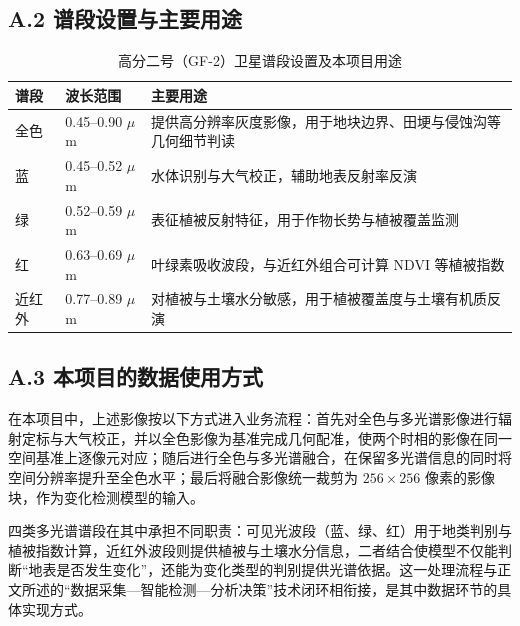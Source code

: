 \documentclass[12pt, a4paper]{ctexart}
\begin{document}
\subsection{A.2 谱段设置与主要用途}

\begin{table}[htbp]
    \centering
    \caption{高分二号（GF-2）卫星谱段设置及本项目用途}
    \label{tab:gf2-bands}
    \small
    \begin{tabular}{|p{2.4cm}|p{3.4cm}|p{7.6cm}|}
        \hline
        \textbf{谱段} & \textbf{波长范围} & \textbf{主要用途} \\
        \hline
        全色 & 0.45--0.90 $\mu$m & 提供高分辨率灰度影像，用于地块边界、田埂与侵蚀沟等几何细节判读 \\
        \hline
        蓝 & 0.45--0.52 $\mu$m & 水体识别与大气校正，辅助地表反射率反演 \\
        \hline
        绿 & 0.52--0.59 $\mu$m & 表征植被反射特征，用于作物长势与植被覆盖监测 \\
        \hline
        红 & 0.63--0.69 $\mu$m & 叶绿素吸收波段，与近红外组合可计算 NDVI 等植被指数 \\
        \hline
        近红外 & 0.77--0.89 $\mu$m & 对植被与土壤水分敏感，用于植被覆盖度与土壤有机质反演 \\
        \hline
    \end{tabular}
\end{table}

\subsection{A.3 本项目的数据使用方式}

在本项目中，上述影像按以下方式进入业务流程：首先对全色与多光谱影像进行辐射定标与大气校正，并以全色影像为基准完成几何配准，使两个时相的影像在同一空间基准上逐像元对应；随后进行全色与多光谱融合，在保留多光谱信息的同时将空间分辨率提升至全色水平；最后将融合影像统一裁剪为 $256 \times 256$ 像素的影像块，作为变化检测模型的输入。

四类多光谱谱段在其中承担不同职责：可见光波段（蓝、绿、红）用于地类判别与植被指数计算，近红外波段则提供植被与土壤水分信息，二者结合使模型不仅能判断“地表是否发生变化”，还能为变化类型的判别提供光谱依据。这一处理流程与正文所述的“数据采集—智能检测—分析决策”技术闭环相衔接，是其中数据环节的具体实现方式。

\setcounter{table}{0}
\renewcommand{\thetable}{B-\arabic{table}}
\end{document}
